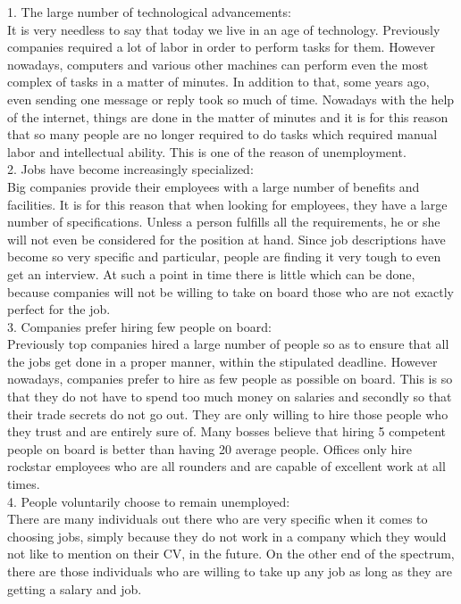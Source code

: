 \documentclass[8pt]{article}
\begin{document}
1. The large number of technological advancements:\\
It is very needless to say that today we live in an age of technology. Previously companies required a lot of labor in order to perform tasks for them.
However nowadays, computers and various other machines can perform even the most complex of tasks in a matter of minutes. In addition to that, some years ago, even sending one message or reply took so much of time.
Nowadays with the help of the internet, things are done in the matter of minutes and it is for this reason that so many people are no longer required to do tasks which required manual labor and intellectual ability. This is one of the reason of unemployment.\\
2. Jobs have become increasingly specialized:\\
Big companies provide their employees with a large number of benefits and facilities. It is for this reason that when looking for employees, they have a large number of specifications.
Unless a person fulfills all the requirements, he or she will not even be considered for the position at hand. Since job descriptions have become so very specific and particular, people are finding it very tough to even get an interview.
At such a point in time there is little which can be done, because companies will not be willing to take on board those who are not exactly perfect for the job.\\
3. Companies prefer hiring few people on board:\\
Previously top companies hired a large number of people so as to ensure that all the jobs get done in a proper manner, within the stipulated deadline.
However nowadays, companies prefer to hire as few people as possible on board. This is so that they do not have to spend too much money on salaries and secondly so that their trade secrets do not go out. They are only willing to hire those people who they trust and are entirely sure of.
Many bosses believe that hiring 5 competent people on board is better than having 20 average people. Offices only hire rockstar employees who are all rounders and are capable of excellent work at all times.\\
4. People voluntarily choose to remain unemployed:\\
There are many individuals out there who are very specific when it comes to choosing jobs, simply because they do not work in a company which they would not like to mention on their CV, in the future.
On the other end of the spectrum, there are those individuals who are willing to take up any job as long as they are getting a salary and job.
\end{document}
